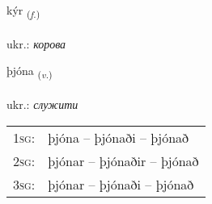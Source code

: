 \documentclass[frontgrid, backgrid]{flacards}\usepackage[]{graphicx}\usepackage[]{xcolor}
\begin{document}
\renewcommand{\flhead}{\vskip5pt \fboxsep=0pt {\small\bfseries\footnotesize Nafnorð | іменник}}
\renewcommand{\fcfoot}{\vskip5pt \fboxsep=0pt \hspace{2pt}{\small\bfseries\footnotesize 2K}}

\renewcommand{\blhead}{\vskip5pt {\small\bfseries\footnotesize Nafnorð | іменник }}
\renewcommand{\bcfoot}{\vskip5pt \hspace{2pt}{\small\bfseries\footnotesize 2K}}


{kýr \small{\textsubscript{(\textit{f.})}} \\[1ex] %
\textphonetic{[cʰiːr]} \\
ukr.: \emph{корова} \\  [2ex]
\renewcommand*{\arraystretch}{0.8}
}

\renewcommand{\flhead}{\vskip5pt \fboxsep=0pt {\small\bfseries\footnotesize Sagnorð | дієслово}}
\renewcommand{\fcfoot}{\vskip5pt \fboxsep=0pt \hspace{2pt}{\small\bfseries\footnotesize 2K}}

\renewcommand{\blhead}{\vskip5pt {\small\bfseries\footnotesize Sagnorð | дієслово }}
\renewcommand{\bcfoot}{\vskip5pt \hspace{2pt}{\small\bfseries\footnotesize 2K}}


{þjóna \small{\textsubscript{(\textit{v.})}} \\[1ex] %
\textphonetic{[θjouːna]} \\
ukr.: \emph{служити} \\  [2ex]
\renewcommand*{\arraystretch}{0.8}
\begin{tabular}{p{1cm}l}
\textsc{1sg}: & þjóna -- þjónaði -- þjónað \\ 
\textsc{2sg}: & þjónar -- þjónaðir -- þjónað \\ 
\textsc{3sg}: & þjónar -- þjónaði -- þjónað \\ 
\end{tabular}
}
\end{document}
